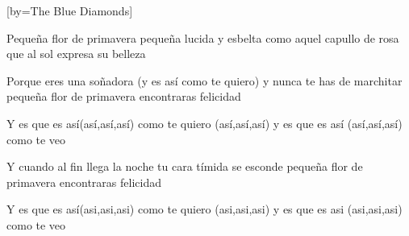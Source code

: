 
[by={The Blue Diamonds}]
     
    
    \beginverse
        Pequeña flor de primavera
        pequeña lucida y esbelta
        como aquel capullo de rosa
        que al sol expresa su belleza
    \endverse
    
    \beginverse
        Porque eres una
        soñadora (y es así como te quiero)
        y nunca te has de marchitar
        pequeña flor de primavera encontraras felicidad
    \endverse

    \beginverse
        Y es que es
        así(así,así,así)
        como te quiero
        (así,así,así)
        y es que es así
        (así,así,así)
        como te veo
    \endverse

    \beginverse
        Y cuando al fin
        llega la noche
        tu cara tímida se esconde
        pequeña flor de primavera
        encontraras felicidad
    \endverse

    \beginverse
        Y es que es
        así(asi,asi,asi)
        como te quiero
        (asi,asi,asi)
        y es que es asi
        (asi,asi,asi)
        como te veo
    \endverse
    
\endsong

\scleardpage
